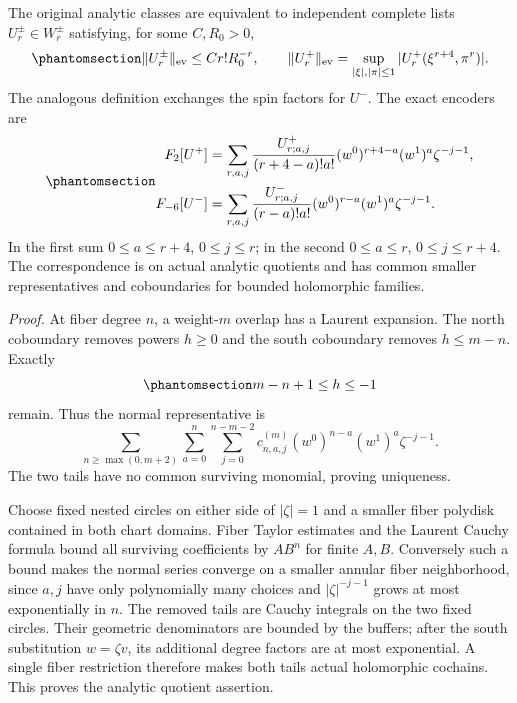 \documentclass[
  english,
  11pt,
  reqno]{amsart}
\begin{document}
The original analytic classes are equivalent to independent complete
lists \(U_r^\pm\in W_r^\pm\) satisfying, for some \(C,R_0>0\),
\begin{equation}\protect\phantomsection\label{eq:gg-original-factorial-bound}{
 \|U_r^\pm\|_{\mathrm{ev}}\le Cr!R_0^{-r},\qquad
 \|U_r^+\|_{\mathrm{ev}}
  =\sup_{|\xi|,|\pi|\le1}|U_r^+(\xi^{r+4},\pi^r)|.
}\end{equation} The analogous definition exchanges the spin factors for
\(U^-\). The exact encoders are
\begin{equation}\protect\phantomsection\label{eq:gg-original-encoders}{
 \begin{aligned}
 F_2[U^+]&=\sum_{r,a,j}
 \frac{U^+_{r;a,j}}{(r+4-a)!a!}
 (w^0)^{r+4-a}(w^1)^a\zeta^{-j-1},\\
 F_{-6}[U^-]&=\sum_{r,a,j}
 \frac{U^-_{r;a,j}}{(r-a)!a!}
 (w^0)^{r-a}(w^1)^a\zeta^{-j-1}.
 \end{aligned}
}\end{equation} In the first sum \(0\le a\le r+4\), \(0\le j\le r\); in
the second \(0\le a\le r\), \(0\le j\le r+4\). The correspondence is on
actual analytic quotients and has common smaller representatives and
coboundaries for bounded holomorphic families.

\emph{Proof.} At fiber degree \(n\), a weight-\(m\) overlap has a
Laurent expansion. The north coboundary removes powers \(h\ge0\) and the
south coboundary removes \(h\le m-n\). Exactly
\begin{equation}\protect\phantomsection\label{eq:gg-surviving-laurent}{
 m-n+1\le h\le-1
}\end{equation} remain. Thus the normal representative is
\[\sum_{n\ge\max(0,m+2)}\sum_{a=0}^n\sum_{j=0}^{n-m-2}
c^{(m)}_{n,a,j}(w^0)^{n-a}(w^1)^a\zeta^{-j-1}.\] The two tails have no
common surviving monomial, proving uniqueness.

Choose fixed nested circles on either side of \(|\zeta|=1\) and a
smaller fiber polydisk contained in both chart domains. Fiber Taylor
estimates and the Laurent Cauchy formula bound all surviving
coefficients by \(AB^n\) for finite \(A,B\). Conversely such a bound
makes the normal series converge on a smaller annular fiber
neighborhood, since \(a,j\) have only polynomially many choices and
\(|\zeta|^{-j-1}\) grows at most exponentially in \(n\). The removed
tails are Cauchy integrals on the two fixed circles. Their geometric
denominators are bounded by the buffers; after the south substitution
\(w=\zeta v\), its additional degree factors are at most exponential. A
single fiber restriction therefore makes both tails actual holomorphic
cochains. This proves the analytic quotient assertion.
\end{document}
